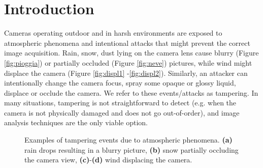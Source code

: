 \documentclass{llncs}
\begin{document}
\section{Introduction}\label{sec:introduction}
Cameras operating outdoor and in harsh environments are exposed to atmospheric phenomena and intentional attacks that might prevent the correct image acquisition. Rain, snow, dust lying on the camera lens cause blurry (Figure \ref{fig:pioggia}) or partially occluded (Figure \ref{fig:neve}) pictures, while wind might displace the camera (Figure \ref{fig:displ1} -\ref{fig:displ2}). Similarly, an attacker can intentionally change the camera focus, spray some opaque or glossy liquid, displace or occlude the camera. We refer to these events/attacks as tampering. In many situations, tampering is not straightforward to detect (e.g. when the camera is not physically damaged and does not go out-of-order), and image analysis techniques are the only viable option.

\begin{figure}[t!]
\centering
{}
\caption{Examples of tampering events due to atmospheric phenomena. \textbf{(a)} rain drops resulting in a blurry picture, \textbf{(b)} snow partially occluding the camera view, \textbf{(c)}-\textbf{(d)} wind displacing the camera.}
\label{fig:tampering}
\end{figure}
\end{document}
